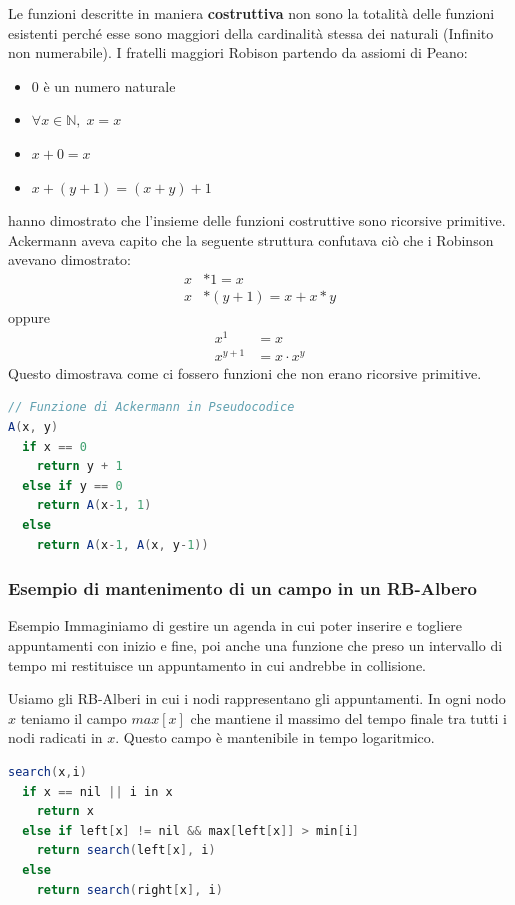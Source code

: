 \documentclass[a4paper]{article}
\begin{document}
Le funzioni descritte in maniera \textbf{costruttiva} non sono la totalità delle funzioni
esistenti perché esse sono maggiori della cardinalità stessa dei naturali (Infinito non numerabile).
I fratelli maggiori Robison partendo da assiomi di Peano:
\begin{itemize}
  \item $0$ è un numero naturale
  \item $\forall x \in \mathbb{N}, \; x=x$
  \item $x+0=x$
  \item $x+(y+1)=(x+y)+1$
\end{itemize}
hanno dimostrato che l'insieme delle funzioni costruttive sono ricorsive primitive.
Ackermann aveva capito che la seguente struttura confutava ciò che i Robinson avevano dimostrato:
\begin{align*}
  x &\ast 1 = x\\
  x &\ast (y+1) = x + x \ast y
\end{align*}
oppure
\begin{align*}
  x^1 &= x\\
  x^{y+1} &= x \cdot x^y
\end{align*}
Questo dimostrava come ci fossero funzioni che non erano ricorsive primitive.
\begin{lstlisting}[language=Scala]
// Funzione di Ackermann in Pseudocodice
A(x, y) 
  if x == 0
    return y + 1
  else if y == 0
    return A(x-1, 1)
  else
    return A(x-1, A(x, y-1))
\end{lstlisting}

\subsubsection{Esempio di mantenimento di un campo in un RB-Albero}

\begin{examplebox}{Esempio}
  Immaginiamo di gestire un agenda in cui poter inserire e togliere appuntamenti con inizio e fine, poi anche
  una funzione che preso un intervallo di tempo mi restituisce un appuntamento in cui andrebbe in collisione.

  Usiamo gli RB-Alberi in cui i nodi rappresentano gli appuntamenti. In ogni nodo $x$ teniamo il campo $max[x]$ che mantiene
  il massimo del tempo finale tra tutti i nodi radicati in $x$. Questo campo è mantenibile in tempo logaritmico.

  \begin{lstlisting}[language=Scala]
search(x,i)
  if x == nil || i in x
    return x
  else if left[x] != nil && max[left[x]] > min[i]
    return search(left[x], i)
  else
    return search(right[x], i)
  \end{lstlisting}
\end{examplebox}
\end{document}
